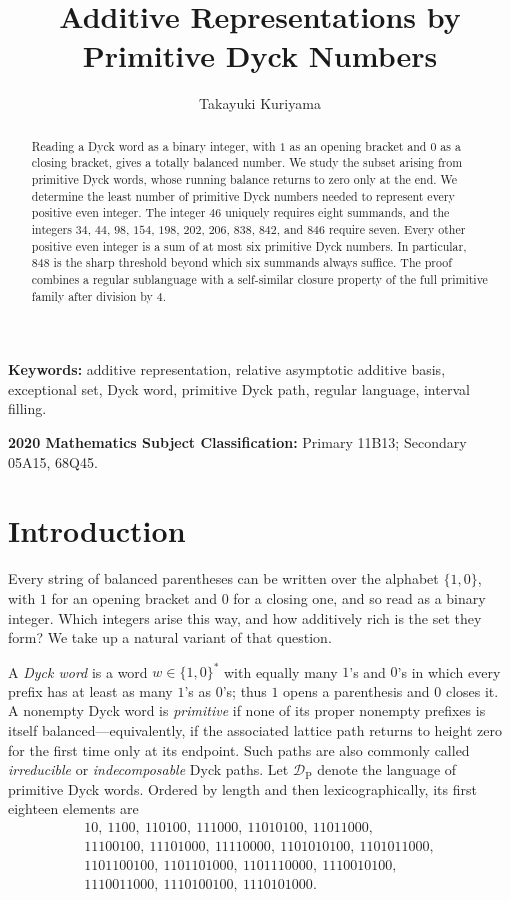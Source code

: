 \documentclass[12pt]{article}
\title{Additive Representations by Primitive Dyck Numbers}
\author{Takayuki Kuriyama}
\date{}
\theoremstyle{plain}
\newcommand{\DP}{\mathcal{D}_{\mathrm{P}}}
\begin{document}
\maketitle

\begin{abstract}
Reading a Dyck word as a binary integer, with $1$ as an opening bracket
and $0$ as a closing bracket, gives a totally balanced number.  We study
the subset arising from primitive Dyck words, whose running balance
returns to zero only at the end.  We determine the least number of
primitive Dyck numbers needed to represent every positive even integer.
The integer $46$ uniquely requires eight summands, and the integers
$34$, $44$, $98$, $154$, $198$, $202$, $206$, $838$, $842$, and $846$
require seven.  Every other positive even integer is a sum of at most
six primitive Dyck numbers.  In particular, $848$ is the sharp threshold
beyond which six summands always suffice.  The proof combines a regular
sublanguage with a self-similar closure property of the full primitive
family after division by $4$.
\end{abstract}

\noindent\textbf{Keywords:} additive representation, relative asymptotic
additive basis, exceptional set, Dyck word, primitive Dyck path, regular
language, interval filling.

\noindent\textbf{2020 Mathematics Subject Classification:} Primary 11B13;
Secondary 05A15, 68Q45.

\section{Introduction}\label{sec:introduction}

Every string of balanced parentheses can be written over the alphabet
$\{1,0\}$, with $1$ for an opening bracket and $0$ for a closing one,
and so read as a binary integer.  Which integers arise this way, and how
additively rich is the set they form?  We take up a natural variant of
that question.

A \emph{Dyck word} is a word $w\in\{1,0\}^*$ with equally many $1$'s
and $0$'s in which every prefix has at least as many $1$'s as $0$'s;
thus $1$ opens a parenthesis and $0$ closes it.  A nonempty Dyck word is
\emph{primitive} if none of its proper nonempty prefixes is itself
balanced---equivalently, if the associated lattice path returns to
height zero for the first time only at its endpoint.  Such paths are
also commonly called \emph{irreducible} or \emph{indecomposable} Dyck
paths.  Let $\DP$ denote the language
of primitive Dyck words.  Ordered by length and then lexicographically,
its first eighteen elements are
\[
\begin{gathered}
10,\ 1100,\ 110100,\ 111000,\ 11010100,\ 11011000,\\
11100100,\ 11101000,\ 11110000,\ 1101010100,\ 1101011000,\\
1101100100,\ 1101101000,\ 1101110000,\ 1110010100,\\
1110011000,\ 1110100100,\ 1110101000.
\end{gathered}
\]
\end{document}
